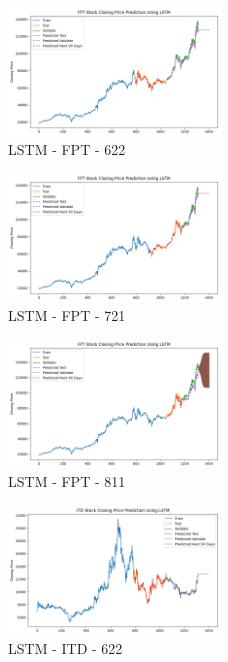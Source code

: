 \documentclass{ieeeojies}
\begin{document}
\begin{figure} [H]
    \centering
    \includegraphics[width=0.5\textwidth]{bibliography/Figure/LSTM_FPT_622_90.png}
    \caption{LSTM - FPT - 622}
    \label{fig:LSTM_FPT_622_90}
\end{figure}
\begin{figure} [H]
    \centering
    \includegraphics[width=0.5\textwidth]{bibliography/Figure/LSTM_FPT_721_90.png}
    \caption{LSTM - FPT - 721}
    \label{fig:LSTM_FPT_721_90}
\end{figure}
\begin{figure} [H]
    \centering
    \includegraphics[width=0.5\textwidth]{bibliography/Figure/LSTM_FPT_811_90.png}
    \caption{LSTM - FPT - 811}
    \label{fig:LSTM_FPT_811_90}
\end{figure}
\begin{figure} [H]
    \centering
    \includegraphics[width=0.5\textwidth]{bibliography/Figure/LSTM_ITD_622_90.png}
    \caption{LSTM - ITD - 622}
    \label{fig:LSTM_ITD_622_90}
\end{figure}
\end{document}
